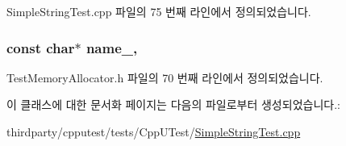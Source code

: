 Simple\+String\+Test.\+cpp 파일의 75 번째 라인에서 정의되었습니다.

\subsubsection[{\texorpdfstring{name\+\_\+}{name_}}]{\setlength{\rightskip}{0pt plus 5cm}const char$\ast$ name\+\_\+\hspace{0.3cm}{\ttfamily [protected]}, {\ttfamily [inherited]}}\hypertarget{class_test_memory_allocator_a7dac8366c11fbcad2f49d85fe8fc4fbe}{}\label{class_test_memory_allocator_a7dac8366c11fbcad2f49d85fe8fc4fbe}


Test\+Memory\+Allocator.\+h 파일의 70 번째 라인에서 정의되었습니다.



이 클래스에 대한 문서화 페이지는 다음의 파일로부터 생성되었습니다.\+:\begin{DoxyCompactItemize}
\item 
thirdparty/cpputest/tests/\+Cpp\+U\+Test/\hyperlink{_simple_string_test_8cpp}{Simple\+String\+Test.\+cpp}\end{DoxyCompactItemize}
